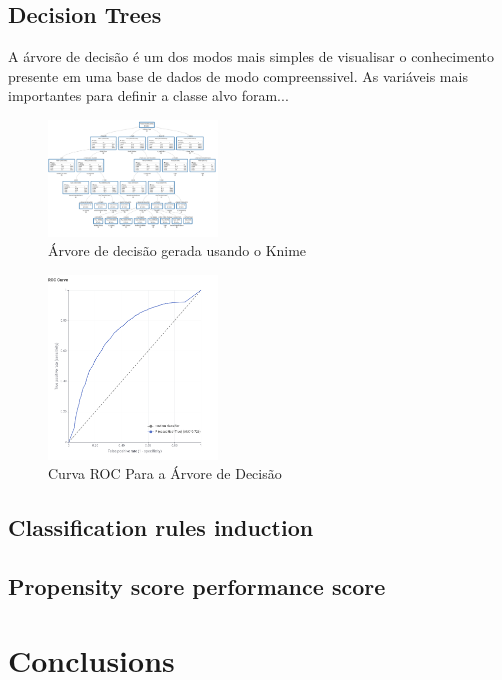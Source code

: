 \documentclass[conference]{IEEEtran}
\begin{document}
\subsection{Decision Trees}

A árvore de decisão é um dos modos mais simples de visualisar o conhecimento presente em uma 
base de dados de modo compreenssivel. As variáveis mais importantes para definir a classe alvo foram...
\begin{figure}[H]
\centerline{\includegraphics[width=0.4\textwidth]{Images/decision-tree.png}}
\caption{\label{fig:decision-tree} Árvore de decisão gerada usando o Knime}
\end{figure}

\begin{figure}[H]
    \centerline{\includegraphics[width=0.4\textwidth]{Images/roc-curve-decision-tree.png}}
    \caption{\label{fig:decision-tree} Curva ROC Para a Árvore de Decisão}
\end{figure}


\subsection{Classification rules induction}
\subsection{Propensity score performance score}


\section{Conclusions}
\end{document}
